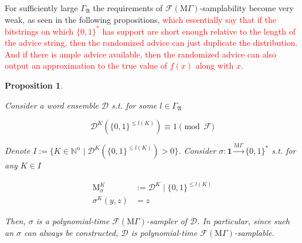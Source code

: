 \documentclass[11pt]{article}
\numberwithin{equation}{section}
\theoremstyle{definition}
\theoremstyle{plain}
\newtheorem{proposition}{Proposition}[section]
\newcommand{\Bool}{\{0,1\}}
\newcommand{\Words}{{\Bool^*}}
\DeclareMathOperator{\M}{M}
\newcommand{\Nats}{\mathbb{N}}
\newcommand{\Dist}{\mathcal{D}}
\newcommand{\GrowA}{\Gamma_{\mathfrak{A}}}
\newcommand{\MGrow}{\mathrm{M}\Gamma}
\newcommand{\Fall}{\mathcal{F}}
\newcommand{\EMG}{\Fall(\MGrow)}
\newcommand{\MScheme}{\xrightarrow{\MGrow}}
\begin{document}
For sufficiently large $\GrowA$ the requirements of $\EMG$-samplability become very weak, as seen in the following propositions, \textcolor{red}{which essentially say that if the bitstrings on which $\Words$ has support are short enough relative to the length of the advice string, then the randomized advice can just duplicate the distribution. And if there is ample advice available, then the randomized advice can also output an approximation to the true value of $f(x)$ along with $x$.}
\begin{samepage}
\begin{proposition}
\label{prp:adv_mgamma_smp}

Consider a word ensemble $\Dist$ s.t. for some $l \in \GrowA$

\begin{equation}
\label{eqn:prp__adv_mgamma_smp}
\Dist^{K}(\Bool^{\leq l(K)}) \equiv 1 \pmod \Fall
\end{equation}

Denote ${I:=\{K \in \Nats^n \mid \Dist^{K}(\Bool^{\leq l(K)}) > 0\}}$. Consider ${\sigma: \bm{1} \MScheme \Words}$ s.t. for any ${K \in I}$

\begin{align*}
\M_\sigma^K&:=\Dist^{K} \mid \Bool^{\leq l(K)} \\
\sigma^K(y,z)&=z
\end{align*}

Then, $\sigma$ is a polynomial-time $\EMG$-sampler of $\Dist$. In particular, since such an $\sigma$ can always be constructed, $\Dist$ is polynomial-time $\EMG$-samplable.

\end{proposition}
\end{samepage}
\end{document}
